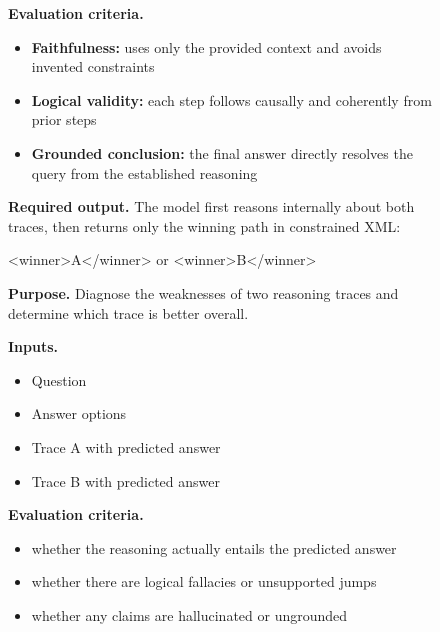 \documentclass[11pt]{article}
\begin{document}
{\begin{figure}[t]
\begin{minipage}[t]{0.485\textwidth}
\begin{tcolorbox}[promptcard,title=LLM-as-Judge]
\vspace{-2pt}
\textbf{Evaluation criteria.}
\begin{itemize}
    \setlength{\itemsep}{1pt}
    \item \textbf{Faithfulness:} uses only the provided context and avoids invented constraints
    \item \textbf{Logical validity:} each step follows causally and coherently from prior steps
    \item \textbf{Grounded conclusion:} the final answer directly resolves the query from the established reasoning
\end{itemize}

\vspace{-2pt}
\textbf{Required output.}
The model first reasons internally about both traces, then returns only the winning path in constrained XML:
\begin{center}
\ttfamily
<winner>A</winner> \quad or \quad <winner>B</winner>
\end{center}
\end{tcolorbox}
\end{minipage}
\hfill
\begin{minipage}[t]{0.485\textwidth}
\begin{tcolorbox}[promptcard,title=LLM-as-Critic]
\textbf{Purpose.} Diagnose the weaknesses of two reasoning traces and determine which trace is better overall.

\vspace{2pt}
\textbf{Inputs.}
\begin{itemize}
    \setlength{\itemsep}{1pt}
    \item Question
    \item Answer options
    \item Trace A with predicted answer
    \item Trace B with predicted answer
\end{itemize}

\vspace{-2pt}
\textbf{Evaluation criteria.}
\begin{itemize}
    \setlength{\itemsep}{1pt}
    \item whether the reasoning actually entails the predicted answer
    \item whether there are logical fallacies or unsupported jumps
    \item whether any claims are hallucinated or ungrounded
\end{itemize}


\end{tcolorbox}
\end{minipage}
\end{figure}}
\end{document}

